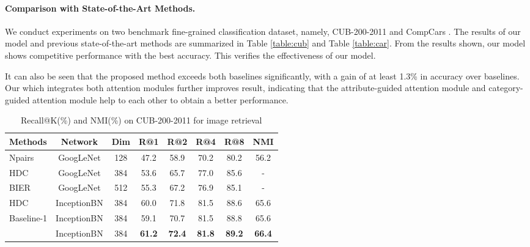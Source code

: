 \documentclass[sigconf]{acmart}
\begin{document}
\paragraph{Comparison with State-of-the-Art Methods.}
We conduct experiments on two benchmark fine-grained classification dataset, namely, CUB-200-2011 \cite{wah2011caltech} and CompCars \cite{yang2015large}. The results of our model and previous state-of-the-art methods are summarized in Table \ref{table:cub} and Table \ref{table:car}. From the results shown, our model shows competitive performance with the best accuracy. This verifies the effectiveness of our model.

It can also be seen that the proposed method exceeds both baselines significantly, with a gain of at least 1.3\% in accuracy over baselines. Our  which integrates both attention modules further improves result, indicating that the attribute-guided attention module and category-guided attention module help to each other to obtain a better performance.

\begin{table*}[!htp]
\renewcommand\arraystretch{1.0}
\centering
\caption{Recall@K(\%) and NMI(\%) on CUB-200-2011 for image retrieval}
\label{table:cub-retrieval}
\begin{tabular}{l|c|c|c|c|c|c|c}
\Xhline{1.0pt}
Methods & Network & Dim & R@1 & R@2 & R@4  & R@8 & NMI   \\ \hline
Npairs \cite{npair} & GoogLeNet & 128  & 47.2  & 58.9  & 70.2 & 80.2 & 56.2  \\
HDC \cite{hdc} & GoogLeNet & 384 & 53.6 & 65.7  & 77.0 & 85.6 & -  \\
BIER \cite{bier}  & GoogLeNet & 512 & 55.3 & 67.2 & 76.9 & 85.1 & - \\ \hline
HDC & InceptionBN  & 384 & 60.0 & 71.8 & 81.5 & 88.6 & 65.6 \\ 

Baseline-1 & InceptionBN  & 384 & 59.1 &  70.7 & 81.5 & 88.8 & 65.6 \\
 & InceptionBN & 384 & \textbf{61.2} &  \textbf{72.4} & \textbf{81.8} & \textbf{89.2} & \textbf{66.4}  \\ \hline
\end{tabular}
\end{table*}
\end{document}
